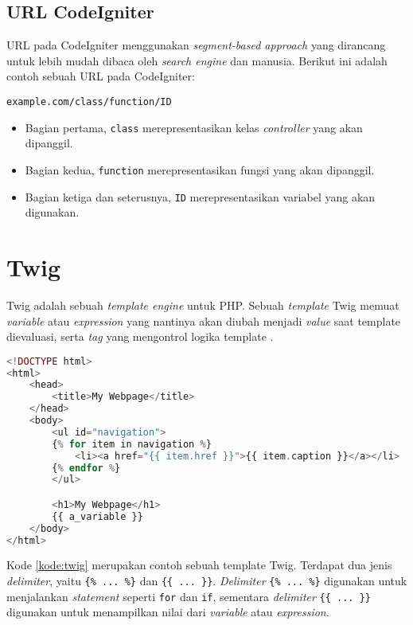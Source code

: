 \subsection{URL CodeIgniter}
\label{subs:ciurl}

URL pada CodeIgniter menggunakan \textit{segment-based approach} yang dirancang untuk lebih mudah dibaca oleh \textit{search engine} dan manusia. Berikut ini adalah contoh sebuah URL pada CodeIgniter:
\begin{center}
    \verb|example.com/class/function/ID|    
\end{center}
\begin{itemize}
	\item Bagian pertama, \verb|class| merepresentasikan kelas \textit{controller} yang akan dipanggil.
	\item Bagian kedua,  \verb|function| merepresentasikan fungsi yang akan dipanggil.
	\item Bagian ketiga dan seterusnya, \verb|ID| merepresentasikan variabel yang akan digunakan.
\end{itemize}

\section{Twig}
\label{sec:twig}

Twig adalah sebuah \textit{template engine} untuk PHP. Sebuah \textit{template} Twig memuat \textit{variable} atau \textit{expression} yang nantinya akan diubah menjadi \textit{value} saat template dievaluasi, serta \textit{tag} yang mengontrol logika template \cite{twig}.

\begin{lstlisting}[language=php, caption=Contoh template Twig, label=kode:twig]
<!DOCTYPE html>
<html>
    <head>
        <title>My Webpage</title>
    </head>
    <body>
        <ul id="navigation">
        {% for item in navigation %}
            <li><a href="{{ item.href }}">{{ item.caption }}</a></li>
        {% endfor %}
        </ul>

        <h1>My Webpage</h1>
        {{ a_variable }}
    </body>
</html>
\end{lstlisting}

Kode \ref{kode:twig} merupakan contoh sebuah template Twig. Terdapat dua jenis \textit{delimiter}, yaitu \verb|{% ... %}| dan \verb|{{ ... }}|. \textit{Delimiter} \verb|{% ... %}| digunakan untuk menjalankan \textit{statement} seperti \verb|for| dan \verb|if|, sementara \textit{delimiter} \verb|{{ ... }}| digunakan untuk menampilkan nilai dari \textit{variable} atau \textit{expression}.

